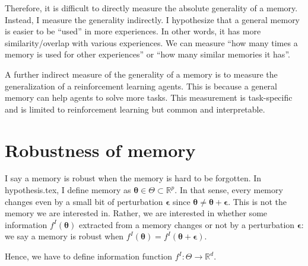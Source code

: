 \documentclass[12pt]{article}
\begin{document}
Therefore, it is difficult to directly measure the absolute generality of a memory. Instead, I measure the 
generality indirectly. I hypothesize that a general memory is easier to be ``used'' in more experiences. In other 
words, it has more similarity/overlap with various experiences. We can measure ``how many times a memory is used for other experiences'' 
or ``how many similar memories it has''.

A further indirect measure of the generality of a memory is to measure the generalization of a reinforcement learning agents. 
This is because a general memory can help agents to solve more tasks. This measurement is task-specific and is limited to 
reinforcement learning but common and interpretable.

\section{Robustness of memory}
I say a memory is robust when the memory is hard to be forgotten. In hypothesis.tex, I define memory as 
$\bm{\theta} \in \Theta \subset \mathbb{R}^p$. In that sense, every memory changes even by a small bit of 
perturbation $\bm{\epsilon}$ since $\bm{\theta} \neq \bm{\theta} + \bm{\epsilon}$. This is not the memory 
we are interested in. Rather, we are interested in whether some information $f^I(\bm{\theta})$ extracted from a memory changes or not 
by a perturbation $\bm{\epsilon}$: we say a memory is robust when $f^I(\bm{\theta}) = f^I(\bm{\theta}+ \bm{\epsilon})$.

Hence, we have to define information function $f^I: \Theta \to \mathbb{R}^d$. 
\end{document}
